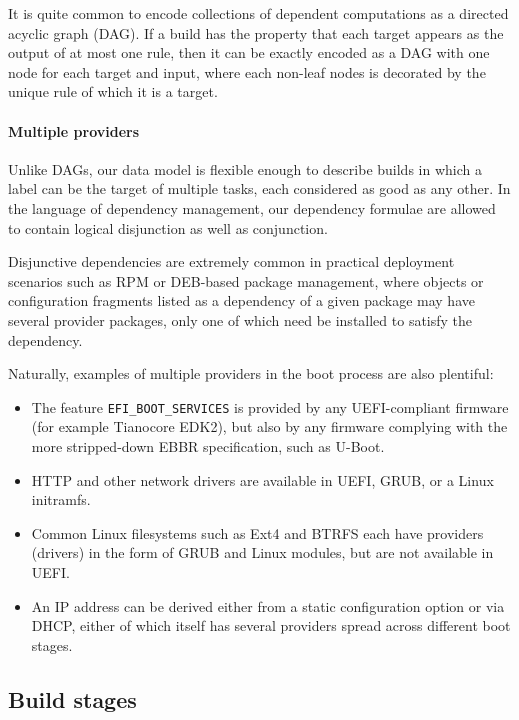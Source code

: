\begin{example} 
  
  It is quite common to encode collections of dependent computations as a directed acyclic graph (DAG).
  If a build has the property that each target appears as the output of at most one rule, then it can be exactly encoded as a DAG with one node for each target and input, where each non-leaf nodes is decorated by the unique rule of which it is a target.

\end{example}

\paragraph{Multiple providers}
%
Unlike DAGs, our data model is flexible enough to describe builds in which a label can be the target of multiple tasks, each considered as good as any other.
%
In the language of dependency management, our dependency formulae are allowed to contain logical disjunction as well as conjunction.

Disjunctive dependencies are extremely common in practical deployment scenarios such as RPM or DEB-based package management, where objects or configuration fragments listed as a dependency of a given package may have several provider packages, only one of which need be installed to satisfy the dependency.

Naturally, examples of multiple providers in the boot process are also plentiful:

\begin{itemize}
  \item
    The feature \texttt{EFI\_BOOT\_SERVICES} is provided by any UEFI-compliant firmware (for example Tianocore EDK2), but also by any firmware complying with the more stripped-down EBBR specification, such as U-Boot.
  \item
    HTTP and other network drivers are available in UEFI, GRUB, or a Linux initramfs.
  \item
    Common Linux filesystems such as Ext4 and BTRFS each have providers (drivers) in the form of GRUB and Linux modules, but are not available in UEFI.
  \item
    An IP address can be derived either from a static configuration option or via DHCP, either of which itself has several providers spread across different boot stages.
\end{itemize}


\subsection{Build stages}

